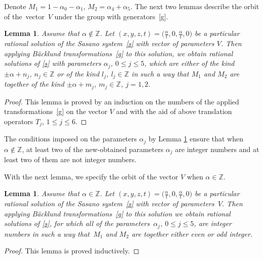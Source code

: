 \documentclass[10pt,a4paper]{amsart}
\numberwithin{equation}{section}
\newtheorem{Lemma}[Theorem]{Lemma}
\begin{document}
 Denote
 $M_1=1-\alpha_0-\alpha_1$, $M_2=\alpha_4+\alpha_5$.
 The next two lemmas describe the orbit of the~vector~$V$
 under the group  with generators~\eqref{g}.


 \begin{Lemma}\label{orbit}
 Assume that $\alpha\notin\mathbb{Z}$.
 Let $(x, y, z, t)=\bigl(\frac{\alpha}{t}, 0, \frac{\alpha}{t}, 0\bigr)$ be a particular rational solution
 of the Sasano system~\eqref{s} with vector of parameters $V$.
 Then applying B\"{a}cklund transformations~\eqref{g} to this solution, we obtain rational solutions of
 \eqref{s} with parameters $\alpha_j$, $0 \leq j \leq 5$, which are either of the kind
 $\pm \alpha + n_j$, $n_j\in\mathbb{Z}$ or of the kind $l_j$, $l_j\in\mathbb{Z}$ in such a way that
 $M_1$ and $M_2$ are together of the kind
 $\pm \alpha + m_j$, $m_j\in\mathbb{Z}$, $j=1,2$.
 \end{Lemma}

 \begin{proof}
 This lemma is proved by an induction on the numbers of the applied transformations~\eqref{g}
 on the vector $V$ and with the aid of above translation operators
 $T_j$, $1 \leq j \leq 6$.
\end{proof}

 \begin{Remark}%
 	The conditions imposed on the parameters $\alpha_j$ by Lemma \ref{orbit} ensure that when ${\alpha\notin\mathbb{Z}}$,
 	at least two of the new-obtained parameters $\alpha_j$ are integer numbers and at least two of them are not integer numbers.
 \end{Remark}

 With the next lemma, we specify the orbit
 of the vector $V$ when $\alpha\in\mathbb{Z}$.

 \begin{Lemma}%
 Assume that $\alpha\in\mathbb{Z}$.
 Let $(x, y, z, t)=\bigl(\frac{\alpha}{t}, 0, \frac{\alpha}{t}, 0\bigr)$ be a particular rational solution
 of the Sasano system~\eqref{s} with vector of parameters~$V$.
 Then applying B\"{a}cklund transformations~\eqref{g} to this solution we obtain rational solutions of
 \eqref{s}, for which all of the parameters~$\alpha_j$, $0 \leq j \leq 5$, are integer numbers
 in such a way that~$M_1$ and $M_2$ are together either even or odd integer.
 \end{Lemma}

 \begin{proof}
 This lemma is proved inductively.
 \end{proof}
\end{document}
